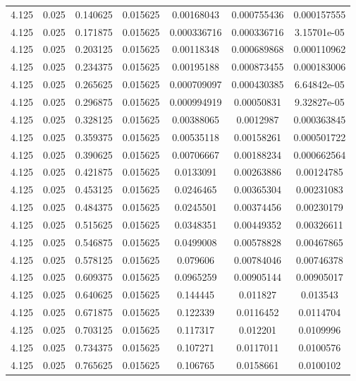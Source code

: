\begin{table}[bh]
\begin{center}
{\begin{tabular}{ccccccc}
4.125	 & 0.025 & 	0.140625	 & 0.015625	 & 0.00168043	 & 0.000755436	 & 0.000157555 \\ 
4.125	 & 0.025 & 	0.171875	 & 0.015625	 & 0.000336716	 & 0.000336716	 & 3.15701e-05 \\ 
4.125	 & 0.025 & 	0.203125	 & 0.015625	 & 0.00118348	 & 0.000689868	 & 0.000110962 \\ 
4.125	 & 0.025 & 	0.234375	 & 0.015625	 & 0.00195188	 & 0.000873455	 & 0.000183006 \\ 
4.125	 & 0.025 & 	0.265625	 & 0.015625	 & 0.000709097	 & 0.000430385	 & 6.64842e-05 \\ 
4.125	 & 0.025 & 	0.296875	 & 0.015625	 & 0.000994919	 & 0.00050831	 & 9.32827e-05 \\ 
4.125	 & 0.025 & 	0.328125	 & 0.015625	 & 0.00388065	 & 0.0012987	 & 0.000363845 \\ 
4.125	 & 0.025 & 	0.359375	 & 0.015625	 & 0.00535118	 & 0.00158261	 & 0.000501722 \\ 
4.125	 & 0.025 & 	0.390625	 & 0.015625	 & 0.00706667	 & 0.00188234	 & 0.000662564 \\ 
4.125	 & 0.025 & 	0.421875	 & 0.015625	 & 0.0133091	 & 0.00263886	 & 0.00124785 \\ 
4.125	 & 0.025 & 	0.453125	 & 0.015625	 & 0.0246465	 & 0.00365304	 & 0.00231083 \\ 
4.125	 & 0.025 & 	0.484375	 & 0.015625	 & 0.0245501	 & 0.00374456	 & 0.00230179 \\ 
4.125	 & 0.025 & 	0.515625	 & 0.015625	 & 0.0348351	 & 0.00449352	 & 0.00326611 \\ 
4.125	 & 0.025 & 	0.546875	 & 0.015625	 & 0.0499008	 & 0.00578828	 & 0.00467865 \\ 
4.125	 & 0.025 & 	0.578125	 & 0.015625	 & 0.079606	 & 0.00784046	 & 0.00746378 \\ 
4.125	 & 0.025 & 	0.609375	 & 0.015625	 & 0.0965259	 & 0.00905144	 & 0.00905017 \\ 
4.125	 & 0.025 & 	0.640625	 & 0.015625	 & 0.144445	 & 0.011827	 & 0.013543 \\ 
4.125	 & 0.025 & 	0.671875	 & 0.015625	 & 0.122339	 & 0.0116452	 & 0.0114704 \\ 
4.125	 & 0.025 & 	0.703125	 & 0.015625	 & 0.117317	 & 0.012201	 & 0.0109996 \\ 
4.125	 & 0.025 & 	0.734375	 & 0.015625	 & 0.107271	 & 0.0117011	 & 0.0100576 \\ 
4.125	 & 0.025 & 	0.765625	 & 0.015625	 & 0.106765	 & 0.0158661	 & 0.0100102 \\ 

\end{tabular}}
\end{center}
\end{table}
